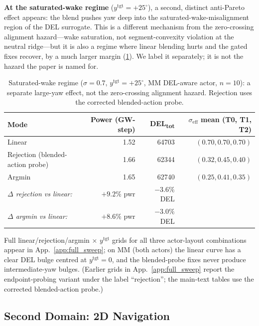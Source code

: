\documentclass{article}
\begin{document}
\textbf{At the saturated-wake regime} ($y^{\mathrm{tgt}}=+25^\circ$), a second, distinct anti-Pareto effect appears: the blend pushes yaw deep into the saturated-wake-misalignment region of the DEL surrogate.
This is a different mechanism from the zero-crossing alignment hazard---wake saturation, not segment-convexity violation at the neutral ridge---but it is also a regime where linear blending hurts and the gated fixes recover, by a much larger margin (\cref{tab:fix_recovery_sat}).
We label it separately; it is not the hazard the paper is named for.

\begin{table}[h]
\centering
\caption{Saturated-wake regime ($\sigma=0.7$, $y^{\mathrm{tgt}}=+25^\circ$, MM DEL-aware actor, $n=10$): a separate large-yaw effect, not the zero-crossing alignment hazard. Rejection uses the corrected blended-action probe.}
\label{tab:fix_recovery_sat}
\small
\begin{tabular}{lrrr}
\toprule
Mode & Power (GW-step) & DEL\textsubscript{tot} & $\sigma_{\mathrm{eff}}$ mean (T0, T1, T2) \\
\midrule
Linear & 1.52 & 64703 & $(0.70, 0.70, 0.70)$ \\
Rejection (blended-action probe) & 1.66 & 62344 & $(0.32, 0.45, 0.40)$ \\
Argmin & 1.65 & 62740 & $(0.25, 0.41, 0.35)$ \\
\midrule
\multicolumn{1}{l}{\emph{$\Delta$ rejection vs linear:}} & $+9.2\%$ pwr & $-3.6\%$ DEL \\
\multicolumn{1}{l}{\emph{$\Delta$ argmin vs linear:}} & $+8.6\%$ pwr & $-3.0\%$ DEL \\
\bottomrule
\end{tabular}
\end{table}

Full linear/rejection/argmin × $y^{\mathrm{tgt}}$ grids for all three actor-layout combinations appear in App.~\ref{app:full_sweep}; on MM (both actors) the linear curve has a clear DEL bulge centred at $y^{\mathrm{tgt}}=0$, and the blended-probe fixes never produce intermediate-yaw bulges.
(Earlier grids in App.~\ref{app:full_sweep} report the endpoint-probing variant under the label ``rejection''; the main-text tables use the corrected blended-action probe.)

\subsection{Second Domain: 2D Navigation}
\label{sec:sg_exp}
\end{document}
